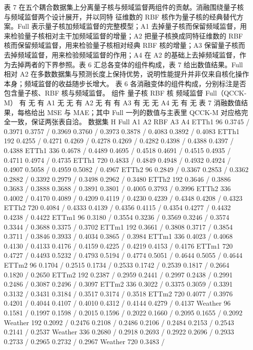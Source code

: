 \documentclass[
]{article}
\begin{document}
表 7
在五个耦合数据集上分离量子核与频域监督两组件的贡献。消融围绕量子核与频域监督两个设计展开，并以同特
征维数的 RBF 核作为量子核的经典替代方案。Full
表示量子核加频域监督的完整模型；A1
去掉量子核而保留频域监督，用来检验量子核相对主干加频域监督的增量；A2
把量子核换成同特征维数的 RBF 核而保留频域监督，用来检验量子核相对经典
RBF 核的增量；A3 保留量子核而去掉频域监督，用来检验频域监督的作用；A4 在
A2 的基础上去掉频域监督，作为去掉两者的下界参照。表 6
汇总各变体的组件构成，表 7 给出数值结果。Full 相对 A2
在多数数据集与预测长度上保持优势，说明性能提升并非仅来自核化操作本身；频域监督的收益随步长增大。
表 6 各消融变体的组件构成，分别标注是否包含量子核、RBF 核与频域监督。
组件 量子核 RBF 核 频域监督 Full（QCCK-M） 有 无 有 A1 无 无 有 A2 无 有
有 A3 有 无 无 A4 无 有 无 表 7 消融数值结果，每格给出 MSE 与 MAE；其中
Full 一列的数值与主表里 QCCK-M 对应格完全一致，保证两张表自洽。 数据集 H
Full A1 A2 RBF A3 A4 ETTh1 96 0.3745 / 0.3971 0.3757 / 0.3969 0.3760 /
0.3973 0.3878 / 0.4083 0.3892 / 0.4083 ETTh1 192 0.4255 / 0.4271 0.4269
/ 0.4278 0.4269 / 0.4282 0.4398 / 0.4388 0.4397 / 0.4388 ETTh1 336
0.4678 / 0.4489 0.4695 / 0.4518 0.4691 / 0.4515 0.4935 / 0.4711 0.4974 /
0.4735 ETTh1 720 0.4833 / 0.4849 0.4948 / 0.4932 0.4924 / 0.4907 0.5058
/ 0.4959 0.5082 / 0.4967 ETTh2 96 0.2849 / 0.3367 0.2853 / 0.3362 0.2882
/ 0.3392 0.2979 / 0.3498 0.2962 / 0.3480 ETTh2 192 0.3646 / 0.3886
0.3683 / 0.3888 0.3688 / 0.3891 0.3801 / 0.4005 0.3793 / 0.3996 ETTh2
336 0.4002 / 0.4170 0.4089 / 0.4209 0.4119 / 0.4230 0.4239 / 0.4348
0.4208 / 0.4323 ETTh2 720 0.4084 / 0.4333 0.4139 / 0.4356 0.4115 /
0.4354 0.4277 / 0.4432 0.4238 / 0.4422 ETTm1 96 0.3180 / 0.3554 0.3236 /
0.3569 0.3246 / 0.3574 0.3344 / 0.3688 0.3375 / 0.3702 ETTm1 192 0.3661
/ 0.3808 0.3717 / 0.3854 0.3711 / 0.3846 0.3933 / 0.4034 0.3865 / 0.3984
ETTm1 336 0.4023 / 0.4068 0.4130 / 0.4133 0.4176 / 0.4159 0.4225 /
0.4219 0.4153 / 0.4176 ETTm1 720 0.4727 / 0.4493 0.5232 / 0.4793 0.5194
/ 0.4774 0.5051 / 0.4644 0.5055 / 0.4644 ETTm2 96 0.1704 / 0.2515 0.1734
/ 0.2533 0.1742 / 0.2539 0.1817 / 0.2664 0.1820 / 0.2650 ETTm2 192
0.2387 / 0.2959 0.2441 / 0.2997 0.2438 / 0.2991 0.2486 / 0.3087 0.2496 /
0.3097 ETTm2 336 0.3022 / 0.3375 0.3059 / 0.3391 0.3132 / 0.3431 0.3184
/ 0.3517 0.3174 / 0.3518 ETTm2 720 0.4077 / 0.3976 0.4201 / 0.4044
0.4107 / 0.4010 0.4312 / 0.4144 0.4279 / 0.4137 Weather 96 0.1581 /
0.1997 0.1598 / 0.2015 0.1596 / 0.2022 0.1660 / 0.2095 0.1655 / 0.2092
Weather 192 0.2092 / 0.2476 0.2108 / 0.2486 0.2106 / 0.2484 0.2153 /
0.2543 0.2141 / 0.2537 Weather 336 0.2680 / 0.2918 0.2693 / 0.2922
0.2696 / 0.2933 0.2733 / 0.2965 0.2732 / 0.2967 Weather 720 0.3483 /
\end{document}
